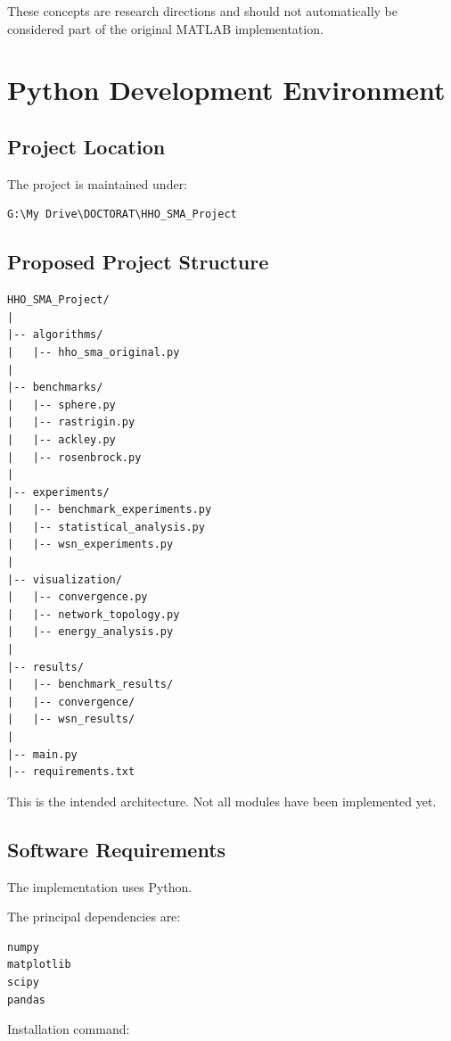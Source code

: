 \documentclass[12pt,a4paper]{report}
\begin{document}
These concepts are research directions and should
not automatically be considered part of the original
MATLAB implementation.

\chapter{Python Development Environment}

\section{Project Location}

The project is maintained under:

\begin{verbatim}
G:\My Drive\DOCTORAT\HHO_SMA_Project
\end{verbatim}

\section{Proposed Project Structure}

\begin{verbatim}
HHO_SMA_Project/
|
|-- algorithms/
|   |-- hho_sma_original.py
|
|-- benchmarks/
|   |-- sphere.py
|   |-- rastrigin.py
|   |-- ackley.py
|   |-- rosenbrock.py
|
|-- experiments/
|   |-- benchmark_experiments.py
|   |-- statistical_analysis.py
|   |-- wsn_experiments.py
|
|-- visualization/
|   |-- convergence.py
|   |-- network_topology.py
|   |-- energy_analysis.py
|
|-- results/
|   |-- benchmark_results/
|   |-- convergence/
|   |-- wsn_results/
|
|-- main.py
|-- requirements.txt
\end{verbatim}

This is the intended architecture. Not all modules
have been implemented yet.

\section{Software Requirements}

The implementation uses Python.

The principal dependencies are:

\begin{lstlisting}
numpy
matplotlib
scipy
pandas
\end{lstlisting}

Installation command:
\end{document}
